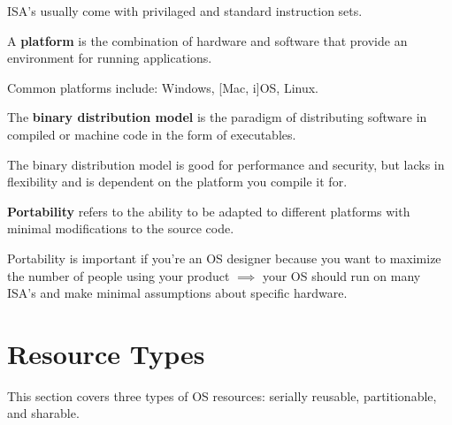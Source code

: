\documentclass{report}
\begin{document}
ISA's usually come with privilaged and standard instruction sets.

\begin{tcolorbox}[title=Definition: Platform]
  A \textbf{platform} is the combination of hardware and software that provide an environment for
  running applications.
\end{tcolorbox}

Common platforms include: Windows, [Mac, i]OS, Linux.

\begin{tcolorbox}[title=Definition: Binary Distribution Model]
  The \textbf{binary distribution model} is the paradigm of distributing software in compiled or
  machine code in the form of executables.
\end{tcolorbox}

The binary distribution model is good for performance and security, but lacks in flexibility and is
dependent on the platform you compile it for.

\begin{tcolorbox}[title=Definition: Portability]
  \textbf{Portability} refers to the ability to be adapted to different platforms with minimal
  modifications to the source code.
\end{tcolorbox}

Portability is important if you're an OS designer because you want to maximize the number of people
using your product $\implies$ your OS should run on many ISA's and make minimal assumptions about
specific hardware.








\chapter{Resource Types}
This section covers three types of OS resources: serially reusable, partitionable, and
sharable.
\end{document}
